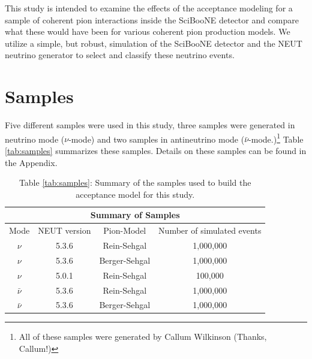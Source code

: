 \documentclass[11pt]{article}
\begin{document}
This study is intended to examine the effects of the acceptance modeling for a sample of coherent pion interactions inside the SciBooNE detector and compare what these would have been for various coherent pion production models. We utilize a simple, but robust, simulation of the SciBooNE detector and the NEUT neutrino generator to select and classify these neutrino events. 



\section{Samples}\label{sec:samples}
Five different samples were used in this study, three samples were generated in neutrino mode ($\nu$-mode) and two samples in antineutrino mode ($\bar{\nu}$-mode.)\footnote{All of these samples were generated by Callum Wilkinson (Thanks, Callum!)} Table \ref*{tab:samples} summarizes these samples. Details on these samples can be found in the Appendix.

\begin{center}
\begin{table}[htb]
	\begin{center}
	\begin{tabular}{c|c|c|c}
	\multicolumn{4}{c}{\textbf{Summary of Samples}} \\
	\hline \hline
	 Mode & NEUT version & Pion-Model & Number of simulated events\\
	\hline
	 $\nu$ & 5.3.6 & Rein-Sehgal & 1,000,000 \\
	\hline
	$\nu$ & 5.3.6 & Berger-Sehgal & 1,000,000 \\
	\hline
	$\nu$ & 5.0.1 & Rein-Sehgal & 100,000 \\
	\hline
	 $\bar{\nu}$ & 5.3.6 & Rein-Sehgal & 1,000,000 \\
	\hline
	$\bar{\nu}$ & 5.3.6 & Berger-Sehgal & 1,000,000 \\
	\hline
	\end{tabular}%
	\caption*{Table \ref*{tab:samples}: Summary of the samples used to build the acceptance model for this study.} 
	\end{center}
\end{table}\label{tab:samples}
\end{center}



\end{document}
